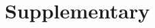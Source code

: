 
\clearpage
\setcounter{page}{1}
\maketitlesupplementary


\section{Supplementary}
\label{sec:supplementary}
